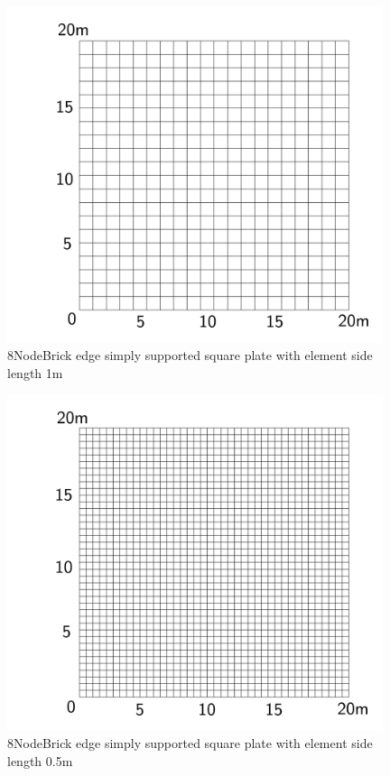 \documentclass[fleqn,11pt]{article}
\begin{document}
\newpage

\begin{figure}[H]
  \centering
  \includegraphics[width=11cm]{../Figure-files/square_plate4.pdf}
  \caption{8NodeBrick edge simply supported square plate with element side length 1m }
  \label{fig 8NodeBrick edges simply supported square plate with element side length 1m }
\end{figure}


\begin{figure}[H]
  \centering
  \includegraphics[width=11cm]{../Figure-files/square_plate5.pdf}
  \caption{8NodeBrick edge simply supported square plate with element side length 0.5m }
  \label{fig 8NodeBrick edges simply supported square plate with element side length 0.5m }
\end{figure}
\end{document}
